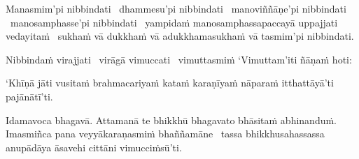\begin{pali-hang}
  Manasmim'pi nibbindati \breathmark\ dhammesu'pi nibbindati \breathmark\ manoviññāṇe'pi nibbindati \breathmark\ manosamphasse'pi nibbindati \breathmark\ yampidaṁ manosamphassapaccayā uppajjati vedayitaṁ \breathmark\ sukhaṁ vā dukkhaṁ vā adukkhamasukhaṁ vā tasmim'pi nibbindati.
\end{pali-hang}

\begin{pali-hang}
  Nibbindaṁ virajjati \breathmark\ virāgā vimuccati \breathmark\ vimuttasmiṁ `Vimuttam'iti ñāṇaṁ hoti:
\end{pali-hang}

\begin{pali-hang}
  `Khīṇā jāti vusitaṁ brahmacariyaṁ kataṁ karaṇīyaṁ nāparaṁ itthattāyā'ti pajānātī'ti.
\end{pali-hang}

\begin{pali-hang}
  Idamavoca bhagavā. Attamanā te bhikkhū bhagavato bhāsitaṁ abhinanduṁ. Imasmiñca pana veyyākaraṇasmiṁ bhaññamāne \breathmark\ tassa bhikkhusahassassa anupādāya āsavehi cittāni vimucciṁsū'ti.
\end{pali-hang}

\suttaRef{[SN 35.28]}

